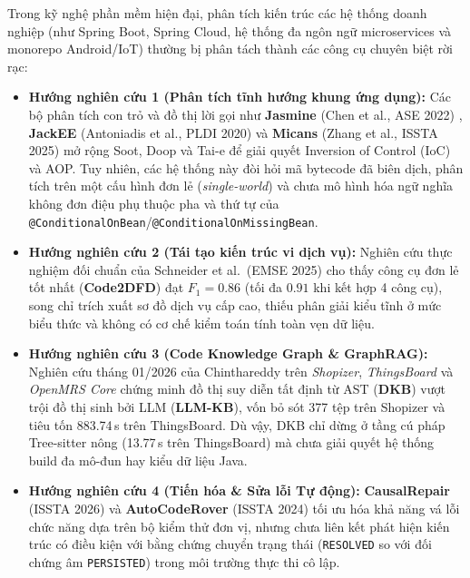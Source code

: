 \documentclass[10pt,a4paper]{article}
\begin{document}
Trong kỹ nghệ phần mềm hiện đại, phân tích kiến trúc các hệ thống doanh nghiệp (như Spring Boot, Spring Cloud, hệ thống đa ngôn ngữ microservices và monorepo Android/IoT) thường bị phân tách thành các công cụ chuyên biệt rời rạc:
\begin{itemize}
    \item \textbf{Hướng nghiên cứu 1 (Phân tích tĩnh hướng khung ứng dụng):} Các bộ phân tích con trỏ và đồ thị lời gọi như \textbf{Jasmine} (Chen et al., ASE 2022) \cite{chen2022jasmine}, \textbf{JackEE} (Antoniadis et al., PLDI 2020) \cite{antoniadis2020jackee} và \textbf{Micans} (Zhang et al., ISSTA 2025) \cite{zhang2025micans} mở rộng Soot, Doop và Tai-e để giải quyết Inversion of Control (IoC) và AOP. Tuy nhiên, các hệ thống này đòi hỏi mã bytecode đã biên dịch, phân tích trên một cấu hình đơn lẻ (\emph{single-world}) và chưa mô hình hóa ngữ nghĩa không đơn điệu phụ thuộc pha và thứ tự của \texttt{@ConditionalOnBean}/\texttt{@ConditionalOnMissingBean}.
    \item \textbf{Hướng nghiên cứu 2 (Tái tạo kiến trúc vi dịch vụ):} Nghiên cứu thực nghiệm đối chuẩn của Schneider et al.\ (EMSE 2025) \cite{schneider2025comparison} cho thấy công cụ đơn lẻ tốt nhất (\textbf{Code2DFD}) đạt $F_1 = 0.86$ (tối đa $0.91$ khi kết hợp 4 công cụ), song chỉ trích xuất sơ đồ dịch vụ cấp cao, thiếu phân giải kiểu tĩnh ở mức biểu thức và không có cơ chế kiểm toán tính toàn vẹn dữ liệu.
    \item \textbf{Hướng nghiên cứu 3 (Code Knowledge Graph \& GraphRAG):} Nghiên cứu tháng 01/2026 của Chinthareddy \cite{chinthareddy2026reliable} trên \emph{Shopizer}, \emph{ThingsBoard} và \emph{OpenMRS Core} chứng minh đồ thị suy diễn tất định từ AST (\textbf{DKB}) vượt trội đồ thị sinh bởi LLM (\textbf{LLM-KB}), vốn bỏ sót 377 tệp trên Shopizer và tiêu tốn 883.74\,s trên ThingsBoard. Dù vậy, DKB chỉ dừng ở tầng cú pháp Tree-sitter nông (13.77\,s trên ThingsBoard) mà chưa giải quyết hệ thống build đa mô-đun hay kiểu dữ liệu Java.
    \item \textbf{Hướng nghiên cứu 4 (Tiến hóa \& Sửa lỗi Tự động):} \textbf{CausalRepair} (ISSTA 2026) \cite{causalrepair2026} và \textbf{AutoCodeRover} (ISSTA 2024) \cite{zhang2024autocoderover} tối ưu hóa khả năng vá lỗi chức năng dựa trên bộ kiểm thử đơn vị, nhưng chưa liên kết phát hiện kiến trúc có điều kiện với bằng chứng chuyển trạng thái (\texttt{RESOLVED} so với đối chứng âm \texttt{PERSISTED}) trong môi trường thực thi cô lập.
\end{itemize}
\end{document}
